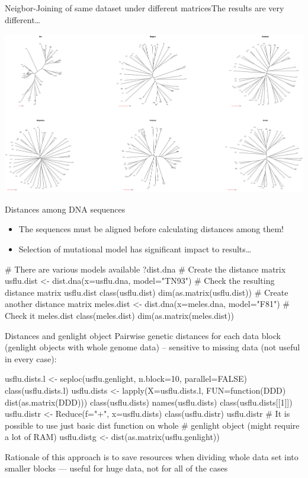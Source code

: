 \documentclass[compress, ucs, xelatex, 11pt, xcolor=svgnames,
  hyperref={
    bookmarks=true,
    unicode=true,
    colorlinks=true,
    pdftitle={Molecular data in R},
    plainpages=false,
    pdfauthor={Vojtech Zeisek},
    pdfsubject={Course about phylogeny and evolution in R},
    pdfcreator={XeLaTeX},
    pdfkeywords={R, evolution, phylogeny, molecular data},
    linkcolor=Tomato,
    anchorcolor=SaddleBrown,
    citecolor=Goldenrod,
    filecolor=DarkMagenta,
    menucolor=Sienna,
    urlcolor=DarkTurquoise,
    pdftex},
  url={hyphens, lowtilde} %
  ]{beamer}
\begin{document}
\begin{frame}{Neigbor-Joining of same dataset under different matrices}{The results are very different\ldots}
  \begin{center}
    \includegraphics[width=\textwidth]{distances.png}
  \end{center}
\end{frame}

\begin{frame}[fragile]{Distances among DNA sequences}
  \begin{itemize}
    \item \alert{The sequences must be aligned before calculating distances among them!}
    \item Selection of mutational model has significant impact to results\ldots
  \end{itemize}
  \vfill
  \begin{spluscode}
    # There are various models available
    ?dist.dna
    # Create the distance matrix
    usflu.dist <- dist.dna(x=usflu.dna, model="TN93")
    # Check the resulting distance matrix
    usflu.dist
    class(usflu.dist)
    dim(as.matrix(usflu.dist))
    # Create another distance matrix
    meles.dist <- dist.dna(x=meles.dna, model="F81")
    # Check it
    meles.dist
    class(meles.dist)
    dim(as.matrix(meles.dist))
  \end{spluscode}
\end{frame}

\begin{frame}[fragile]{Distances and genlight object}
  \vfill
  Pairwise genetic distances for each data block (genlight objects with whole genome data) -- sensitive to missing data (not useful in every case):
  \vfill
  \begin{spluscode}
    usflu.dists.l <- seploc(usflu.genlight, n.block=10, parallel=FALSE)
    class(usflu.dists.l)
    usflu.dists <- lapply(X=usflu.dists.l, FUN=function(DDD)
      dist(as.matrix(DDD)))
    class(usflu.dists)
    names(usflu.dists)
    class(usflu.dists[[1]])
    usflu.distr <- Reduce(f="+", x=usflu.dists)
    class(usflu.distr)
    usflu.distr
    # It is possible to use just basic dist function on whole
    # genlight object (might require a lot of RAM)
    usflu.distg <- dist(as.matrix(usflu.genlight))
  \end{spluscode}
  \vfil
  Rationale of this approach is to save resources when dividing whole data set into smaller blocks --- useful for huge data, not for all of the cases
  \vfill
\end{frame}
\end{document}

